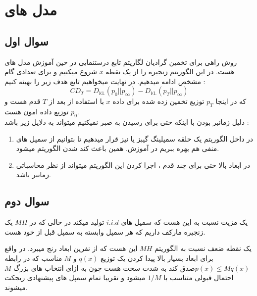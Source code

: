 \newpage
\section{مدل های }
\subsection{سوال اول}
روش  راهی برای تخمین گرادیان لگاریتم تابع درستنمایی در حین آموزش مدل های  هست.
در این الگوریتم زنجیره  را از یک نقطه $x$  شروع میکنیم و برای تعدادی گام مشخص ادامه میدهیم. در نهایت میخواهیم تابع هدف زیر را بهینه کنیم :
\begin{equation*}
    CD_T = D_{\mathbb{KL}} (p_0 ||p_\infty) - D_{\mathbb{KL}}(p_T ||p_\infty)
\end{equation*}
که در اینجا $p_T$ توزیع تخمین زده شده برای داده $x$ با استفاده از  بعد از $T$  قدم هست و $p_0$ توزیع داده امون هست.\\
دلیل زمانبر بودن با اینکه حتی برای رسیدن به  صبر نمیکنیم میتواند به دلایل زیر باشد :
\begin{enumerate}
    \item در داخل الگوریتم  یک حلقه سمپلینگ گیبز یا  نیز قرار میدهیم تا بتوانیم از سمپل های منفی هم بهره ببریم در آموزش. همین باعث کند شدن الگوریتم میشود.
    \item در ابعاد بالا حتی برای چند قدم ، اجرا کردن این الگوریتم میتواند از نظر محاسباتی زمانبر باشد.
\end{enumerate}
\subsection{سوال دوم}

یک مزیت نسبت به  این هست که سمپل های $i.i.d$ تولید میکند در حالی که در $MH$ یک زنجیره مارکف داریم که هر سمپل وابسته به سمپل قبل از خود هست.

یک نقطه ضعف نسبت به الگوریتم $MH$ این هست که  از نفرین ابعاد رنج میبرد. در واقع برای ابعاد بسیار بالا پیدا کردن یک توزیع $q(x)$ و $M$ مناسب که در رابطه $p(x)\leq Mq(x)$صدق کند به شدت سخت هست چون به ازای انتخاب های بزرگ $M$ احتمال قبولی متناسب با $1/M$ میشود و تقریبا تمام سمپل های پیشنهادی ریجکت میشوند.

